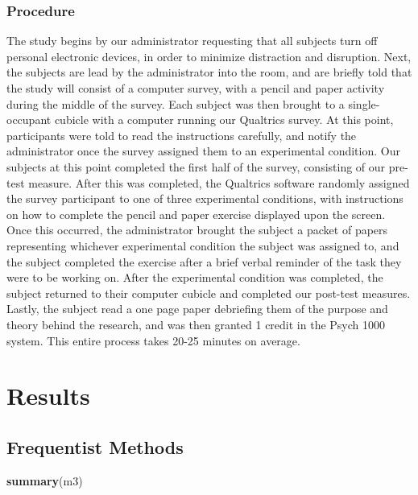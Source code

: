 \documentclass[
]{article}
\newenvironment{Shaded}{\begin{snugshade}}{\end{snugshade}}
\newcommand{\KeywordTok}[1]{\textcolor[rgb]{0.13,0.29,0.53}{\textbf{#1}}}
\newcommand{\NormalTok}[1]{#1}
\begin{document}
\hypertarget{procedure}{%
\subsubsection{Procedure}\label{procedure}}

The study begins by our administrator requesting that all subjects turn
off personal electronic devices, in order to minimize distraction and
disruption. Next, the subjects are lead by the administrator into the
room, and are briefly told that the study will consist of a computer
survey, with a pencil and paper activity during the middle of the
survey. Each subject was then brought to a single-occupant cubicle with
a computer running our Qualtrics survey. At this point, participants
were told to read the instructions carefully, and notify the
administrator once the survey assigned them to an experimental
condition. Our subjects at this point completed the first half of the
survey, consisting of our pre-test measure. After this was completed,
the Qualtrics software randomly assigned the survey participant to one
of three experimental conditions, with instructions on how to complete
the pencil and paper exercise displayed upon the screen. Once this
occurred, the administrator brought the subject a packet of papers
representing whichever experimental condition the subject was assigned
to, and the subject completed the exercise after a brief verbal reminder
of the task they were to be working on. After the experimental condition
was completed, the subject returned to their computer cubicle and
completed our post-test measures. Lastly, the subject read a one page
paper debriefing them of the purpose and theory behind the research, and
was then granted 1 credit in the Psych 1000 system. This entire process
takes 20-25 minutes on average.

\hypertarget{results}{%
\section{Results}\label{results}}

\hypertarget{frequentist-methods}{%
\subsection{Frequentist Methods}\label{frequentist-methods}}

\begin{Shaded}
\begin{Highlighting}[]
\KeywordTok{summary}\NormalTok{(m3)}
\end{Highlighting}
\end{Shaded}
\end{document}
